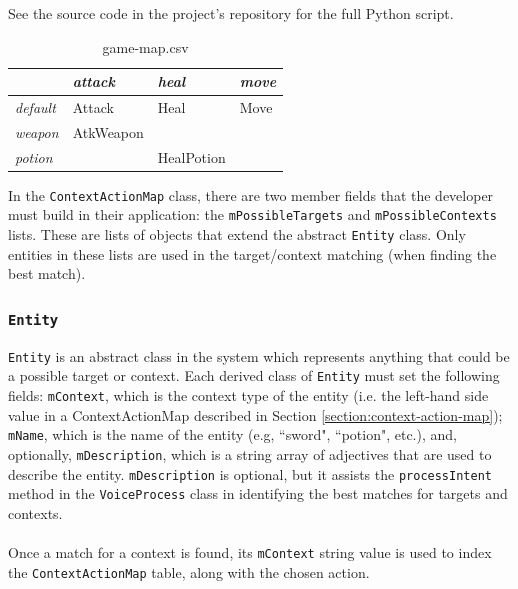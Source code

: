 \documentclass[11pt]{article}
\begin{document}
See the source code in the project's repository for the full Python script.

\begin{table}[H]
\centering
\caption{game-map.csv}
\label{table:game-map-csv}
\begin{tabular}{l|l|l|l|}
\cline{1-4}
\multicolumn{1}{|l|}{\textbf{}} & \textit{attack}    & \textit{heal}  & \textit{move}    \\ \hline
\multicolumn{1}{|l|}{\textit{default}} & Attack    & Heal  & Move    \\ \hline
\multicolumn{1}{|l|}{\textit{weapon}}  & AtkWeapon &            &  \\ \hline
\multicolumn{1}{|l|}{\textit{potion}}  &                & HealPotion &              \\ \hline
\end{tabular}
\end{table}

In the \texttt{ContextActionMap} class, there are two member fields that the developer must build in their application: the \texttt{mPossibleTargets} and \texttt{mPossibleContexts} lists. These are lists of objects that extend the abstract \texttt{Entity} class. Only entities in these lists are used in the target/context matching (when finding the best match).

\subsubsection{\texttt{Entity}}
\label{section:entity}

\texttt{Entity} is an abstract class in the system which represents anything that could be a possible target or context. Each derived class of \texttt{Entity} must set the following fields: \texttt{mContext}, which is the context type of the entity (i.e. the left-hand side value in a ContextActionMap described in Section \ref{section:context-action-map}); \texttt{mName}, which is the name of the entity (e.g, ``sword", ``potion", etc.), and, optionally, \texttt{mDescription}, which is a string array of adjectives that are used to describe the entity. \texttt{mDescription} is optional, but it assists the \texttt{processIntent} method in the \texttt{VoiceProcess} class in identifying the best matches for targets and contexts.
\\
\\
Once a match for a context is found, its \texttt{mContext} string value is used to index the \texttt{ContextActionMap} table, along with the chosen action.
\end{document}

